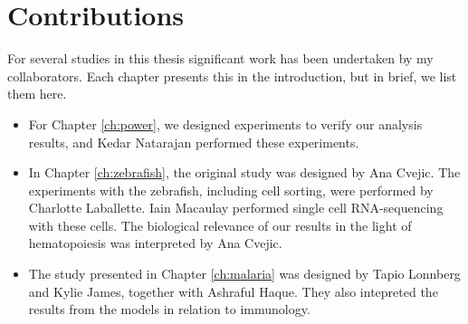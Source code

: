 \section*{Contributions}

For several studies in this thesis significant work has been undertaken by my collaborators. Each chapter presents this in the introduction, but in brief, we list them here.

\begin{itemize}
    \item For Chapter \ref{ch:power}, we designed experiments to verify our analysis results, and Kedar Natarajan performed these experiments.
    \item In Chapter \ref{ch:zebrafish}, the original study was designed by Ana Cvejic. The experiments with the zebrafish, including cell sorting, were performed by Charlotte Laballette. Iain Macaulay performed single cell RNA-sequencing with these cells. The biological relevance of our results in the light of hematopoiesis was interpreted by Ana Cvejic.
    \item The study presented in Chapter \ref{ch:malaria} was designed by Tapio Lonnberg and Kylie James, together with Ashraful Haque. They also intepreted the results from the models in relation to immunology.
\end{itemize}
